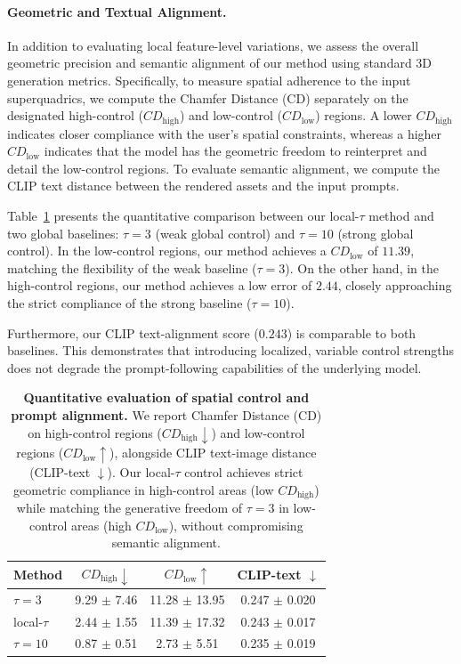 \paragraph{Geometric and Textual Alignment.}
In addition to evaluating local feature-level variations, we assess the overall geometric precision and semantic alignment of our method using standard 3D generation metrics. Specifically, to measure spatial adherence to the input superquadrics, we compute the Chamfer Distance (CD) separately on the designated high-control ($CD_{\text{high}}$) and low-control ($CD_{\text{low}}$) regions. A lower $CD_{\text{high}}$ indicates closer compliance with the user's spatial constraints, whereas a higher $CD_{\text{low}}$ indicates that the model has the geometric freedom to reinterpret and detail the low-control regions. To evaluate semantic alignment, we compute the CLIP text distance between the rendered assets and the input prompts.

Table~\ref{tab:quantitative_spatial} presents the quantitative comparison between our local-$\tau$ method and two global baselines: $\tau = 3$ (weak global control) and $\tau = 10$ (strong global control). In the low-control regions, our method achieves a $CD_{\text{low}}$ of $11.39$, matching the flexibility of the weak baseline ($\tau = 3$). On the other hand, in the high-control regions, our method achieves a low error of $2.44$, closely approaching the strict compliance of the strong baseline ($\tau = 10$).

Furthermore, our CLIP text-alignment score ($0.243$) is comparable to both baselines. This demonstrates that introducing localized, variable control strengths does not degrade the prompt-following capabilities of the underlying model.

\begin{table}[t]
\centering
\small
\begin{tabular}{lccc}
\toprule
Method & $CD_{\text{high}} \downarrow$ & $CD_{\text{low}} \uparrow$ & CLIP-text $\downarrow$ \\
\midrule
$\tau=3$ & 9.29 $\pm$ 7.46 & 11.28 $\pm$ 13.95 & 0.247 $\pm$ 0.020 \\
local-$\tau$ & 2.44 $\pm$ 1.55 & 11.39 $\pm$ 17.32 & 0.243 $\pm$ 0.017 \\
$\tau=10$ & 0.87 $\pm$ 0.51 & 2.73 $\pm$ 5.51 & 0.235 $\pm$ 0.019 \\
\bottomrule
\end{tabular}
\caption{\textbf{Quantitative evaluation of spatial control and prompt alignment.} We report Chamfer Distance (CD) on high-control regions ($CD_{\text{high}} \downarrow$) and low-control regions ($CD_{\text{low}} \uparrow$), alongside CLIP text-image distance (CLIP-text $\downarrow$). Our local-$\tau$ control achieves strict geometric compliance in high-control areas (low $CD_{\text{high}}$) while matching the generative freedom of $\tau = 3$ in low-control areas (high $CD_{\text{low}}$), without compromising semantic alignment.}
\label{tab:quantitative_spatial}
\end{table}

